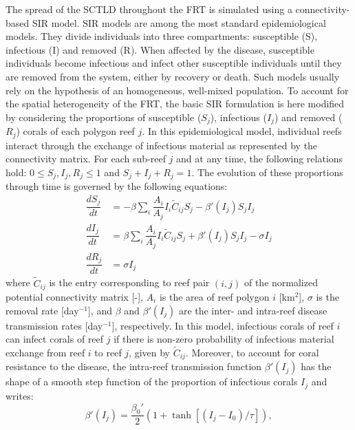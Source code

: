\documentclass[utf8]{frontiersSCNS}
\begin{document}
The spread of the SCTLD throughout the FRT is simulated using a connectivity-based \cite{kermack1927contribution} SIR model. SIR models are among the most standard epidemiological models. They divide individuals into three compartments: susceptible (S), infectious (I) and removed (R). When affected by the disease, susceptible individuals become infectious and infect other susceptible individuals until they are removed from the system, either by recovery or death. Such models usually rely on the hypothesis of an homogeneous, well-mixed population. To account for the spatial heterogeneity of the FRT, the basic SIR formulation is here modified by considering the proportions of susceptible ($S_j$), infectious ($I_j$) and removed ($R_j$) corals of each polygon reef $j$. In this epidemiological model, individual reefs interact through the exchange of infectious material as represented by the connectivity matrix. For each sub-reef $j$ and at any time, the following relations hold: $0\leq S_j,I_j,R_j\leq 1$ and $S_j+I_j+R_j=1$. The evolution of these proportions through time is governed by the following equations:
\begin{equation}
    \begin{aligned}
        \dfrac{dS_j}{dt} &= -\beta\sum_i\dfrac{A_i}{A_j}I_i\tilde{C}_{ij}S_j - \beta'(I_j)S_jI_j \\
        \dfrac{dI_j}{dt} &= \beta\sum_i\dfrac{A_i}{A_j}I_i\tilde{C}_{ij}S_j + \beta'(I_j)S_jI_j - \sigma I_j \\
        \dfrac{dR_j}{dt} &= \sigma I_j
    \end{aligned}\label{eq:epidemio}
\end{equation}
where $\tilde{C}_{ij}$ is the entry corresponding to reef pair $(i,j)$ of the normalized potential connectivity matrix [-], $A_i$ is the area of reef polygon $i$ [km$^2$], $\sigma$ is the removal rate [day$^{-1}$], and $\beta$ and $\beta'(I_j)$ are the inter- and intra-reef disease transmission rates [day$^{-1}$], respectively. In this model, infectious corals of reef $i$ can infect corals of reef $j$ if there is non-zero probability of infectious material exchange from reef $i$ to reef $j$, given by $\tilde{C}_{ij}$. Moreover, to account for coral resistance to the disease, the intra-reef transmission function $\beta'(I_j)$ has the shape of a smooth step function of the proportion of infectious corals $I_j$ and writes:
\begin{equation}
    \beta'(I_j) = \dfrac{\beta_0'}{2}(1+\tanh[(I_j-I_0)/\tau]),\label{eq:beta}
\end{equation}
\end{document}
